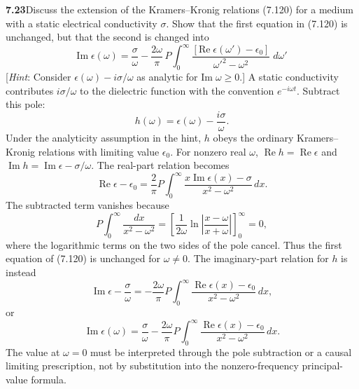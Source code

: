 \par\bigskip
\noindent\textbf{7.23}\quad Discuss the extension of the Kramers--Kronig relations (7.120) for a medium with a static electrical conductivity $\sigma$. Show that the first equation in (7.120) is unchanged, but that the second is changed into
\[
\mathrm{Im}\;\epsilon(\omega)=\frac{\sigma}{\omega}-\frac{2\omega}{\pi}\,P\int_{0}^{\infty}\frac{[\mathrm{Re}\;\epsilon(\omega')-\epsilon_{0}]}{\omega'^{2}-\omega^{2}}\;d\omega'
\]
[\emph{Hint}: Consider $\epsilon(\omega)-i\sigma/\omega$ as analytic for $\mathrm{Im}\;\omega\geq0$.]
\solution
A static conductivity contributes $i\sigma/\omega$ to the dielectric
function with the convention $e^{-i\omega t}$. Subtract this pole:
\[
h(\omega)=\epsilon(\omega)-\frac{i\sigma}{\omega}.
\]
Under the analyticity assumption in the hint, $h$ obeys the ordinary
Kramers--Kronig relations with limiting value $\epsilon_0$.
For nonzero real $\omega$, $\operatorname{Re}h=\operatorname{Re}\epsilon$
and $\operatorname{Im}h=\operatorname{Im}\epsilon-\sigma/\omega$.
The real-part relation becomes
\[
\operatorname{Re}\epsilon-\epsilon_0
=\frac2\pi P\int_0^\infty
\frac{x\operatorname{Im}\epsilon(x)-\sigma}{x^2-\omega^2}\,dx.
\]
The subtracted term vanishes because
\[
P\int_0^\infty\frac{dx}{x^2-\omega^2}
=\left[\frac1{2\omega}\ln\left|\frac{x-\omega}{x+\omega}\right|
\right]_0^\infty=0,
\]
where the logarithmic terms on the two sides of the pole cancel.
Thus the first equation of (7.120) is unchanged for $\omega\ne0$.
The imaginary-part relation for $h$ is instead
\[
\operatorname{Im}\epsilon-\frac\sigma\omega
=-\frac{2\omega}\pi P\int_0^\infty
\frac{\operatorname{Re}\epsilon(x)-\epsilon_0}{x^2-\omega^2}\,dx,
\]
or
\[
\boxed{\operatorname{Im}\epsilon(\omega)=\frac\sigma\omega
-\frac{2\omega}\pi P\int_0^\infty
\frac{\operatorname{Re}\epsilon(x)-\epsilon_0}{x^2-\omega^2}\,dx.}
\]
The value at $\omega=0$ must be interpreted through the pole
subtraction or a causal limiting prescription, not by substitution
into the nonzero-frequency principal-value formula.

